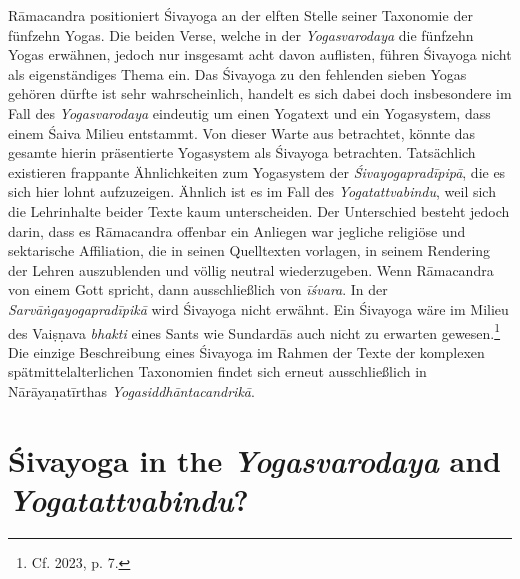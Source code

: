 Rāmacandra positioniert Śivayoga an der elften Stelle seiner Taxonomie der fünfzehn Yogas. Die beiden Verse, welche in der \textit{Yogasvarodaya} die fünfzehn Yogas erwähnen, jedoch nur insgesamt acht davon auflisten, führen Śivayoga nicht als eigenständiges Thema ein. Das Śivayoga zu den fehlenden sieben Yogas gehören dürfte ist sehr wahrscheinlich, handelt es sich dabei doch insbesondere im Fall des \textit{Yogasvarodaya} eindeutig um einen Yogatext und ein Yogasystem, dass einem Śaiva Milieu entstammt. Von dieser Warte aus betrachtet, könnte das gesamte hierin präsentierte Yogasystem als Śivayoga betrachten. Tatsächlich existieren frappante Ähnlichkeiten zum Yogasystem der \textit{Śivayogapradīpipā}, die es sich hier lohnt aufzuzeigen. Ähnlich ist es im Fall des \textit{Yogatattvabindu}, weil sich die Lehrinhalte beider Texte kaum unterscheiden. Der Unterschied besteht jedoch darin, dass es Rāmacandra offenbar ein Anliegen war jegliche religiöse und sektarische Affiliation, die in seinen Quelltexten vorlagen, in seinem Rendering der Lehren auszublenden und völlig neutral wiederzugeben. Wenn Rāmacandra von einem Gott spricht, dann ausschließlich von \textit{īśvara}. In der \textit{Sarvāṅgayogapradīpikā} wird Śivayoga nicht erwähnt. Ein Śivayoga wäre im Milieu des Vaiṣṇava \textit{bhakti} eines Sants wie Sundardās auch nicht zu erwarten gewesen.\footnote{Cf. \citeauthor{horstmann2023shrine} 2023, p. 7.} Die einzige Beschreibung eines Śivayoga im Rahmen der Texte der komplexen spätmittelalterlichen Taxonomien findet sich erneut ausschließlich in Nārāyaṇatīrthas \textit{Yogasiddhāntacandrikā}. 

\section{Śivayoga in the \textit{Yogasvarodaya} and \textit{Yogatattvabindu}?}


